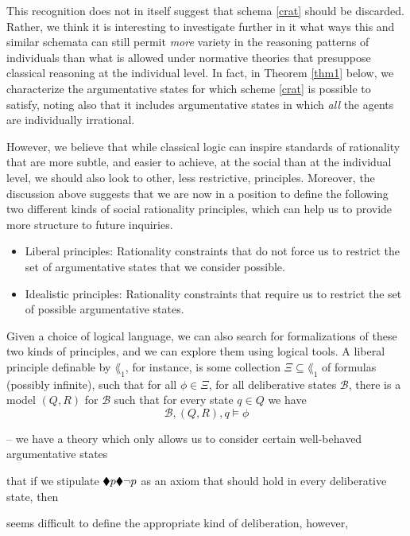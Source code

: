 \documentclass[greybox]{svmult}
\newcommand{\views}{\mathcal B}
\begin{document}
This recognition does not in itself suggest that schema \ref{crat} should be discarded. Rather, we think it is interesting to investigate further in it what ways this and similar schemata can still permit \emph{more} variety in the reasoning patterns of individuals than what is allowed under normative theories that presuppose classical reasoning at the individual level. In fact, in Theorem \ref{thm1} below, we characterize the argumentative states for which scheme \ref{crat} is possible to satisfy, noting also that it includes argumentative states in which \emph{all} the agents are individually irrational.

However, we believe that while classical logic can inspire standards of rationality that are more subtle, and easier to achieve, at the social than at the individual level, we should also look to other, less restrictive, principles.  Moreover, the discussion above suggests that we are now in a position to define the following two different kinds of social rationality principles, which can help us to provide more structure to future inquiries.

\begin{itemize}
\item Liberal principles: Rationality constraints that do not force us to restrict the set of argumentative states that we consider possible. 
\item Idealistic principles: Rationality constraints that require us to restrict the set of possible argumentative states.
\end{itemize}



Given a choice of logical language, we can also search for formalizations of these two kinds of principles, and we can explore them using logical tools. A liberal principle definable by $\lang_1$, for instance, is some collection $\Xi \subseteq \lang_1$ of formulas (possibly infinite), such that for all $\phi \in \Xi$, for all deliberative states $\views$, there is a model $(Q,R)$ for $\views$ such that for every state $q \in Q$ we have
$$
\views,(Q,R),q\models \phi
$$


  -- we have a theory which only allows us to consider certain well-behaved argumentative states

 that if we stipulate $\blacklozenge p  \blacklozenge \neg p$ as an axiom that should hold in every deliberative state, then 


 seems difficult to define the appropriate kind of deliberation, however, 
\end{document}
